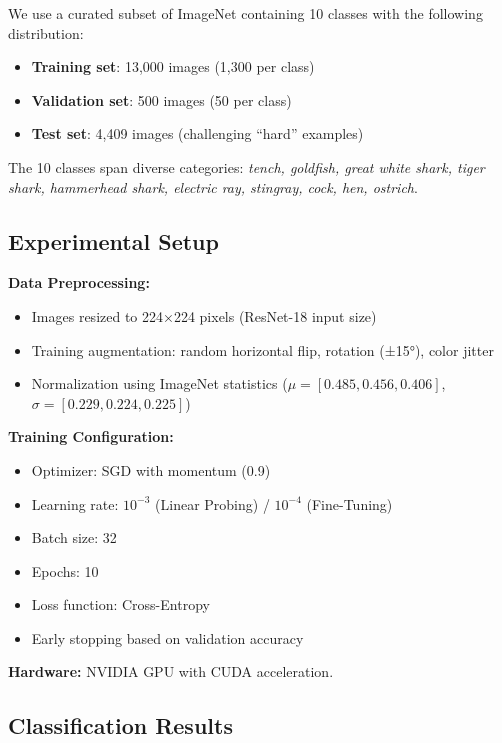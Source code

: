 \documentclass[11pt,a4paper]{article}
\begin{document}
We use a curated subset of ImageNet containing 10 classes with the following distribution:

\begin{itemize}
    \item \textbf{Training set}: 13,000 images (1,300 per class)
    \item \textbf{Validation set}: 500 images (50 per class)
    \item \textbf{Test set}: 4,409 images (challenging ``hard'' examples)
\end{itemize}

The 10 classes span diverse categories: \textit{tench, goldfish, great white shark, tiger shark, hammerhead shark, electric ray, stingray, cock, hen, ostrich}.

\subsection{Experimental Setup}

\textbf{Data Preprocessing:}
\begin{itemize}
    \item Images resized to 224×224 pixels (ResNet-18 input size)
    \item Training augmentation: random horizontal flip, rotation (±15°), color jitter
    \item Normalization using ImageNet statistics ($\mu = [0.485, 0.456, 0.406]$, $\sigma = [0.229, 0.224, 0.225]$)
\end{itemize}

\textbf{Training Configuration:}
\begin{itemize}
    \item Optimizer: SGD with momentum (0.9)
    \item Learning rate: $10^{-3}$ (Linear Probing) / $10^{-4}$ (Fine-Tuning)
    \item Batch size: 32
    \item Epochs: 10
    \item Loss function: Cross-Entropy
    \item Early stopping based on validation accuracy
\end{itemize}

\textbf{Hardware:} NVIDIA GPU with CUDA acceleration.

\subsection{Classification Results}
\end{document}
